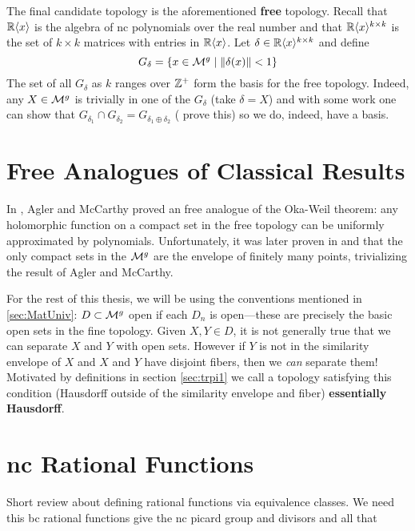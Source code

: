 The final candidate topology is the aforementioned \textbf{free} topology.
Recall that \(\mathbb{R} \langle x \rangle \) is the algebra of nc polynomials over the
real number and that
\(\mathbb{R} \langle x \rangle ^{k\times k}\) is the set of \(k \times k\) matrices
with entries in \(\mathbb{R} \langle x \rangle \). Let
\(\delta \in \mathbb{R} \langle x \rangle ^{k\times k}\) and define
\[
  G_\delta = \{x \in \mathcal{M}^{g} \mid \| \delta(x) \| <1\}
\]
The set of all \(G_\delta\) as \(k\) ranges over \(\mathbb{Z} ^+\) form the basis for
the free topology. Indeed, any \(X \in \mathcal{M}^{g} \) is trivially in one of the
\(G_\delta\) (take \(\delta=X\)) and with some work one can show that
\(G_{\delta_1} \cap G_{\delta_2}= G_{\delta_1\oplus \delta_2}\) ({\color{red}
  prove this}) so we do,
indeed, have a basis.

\section{Free Analogues of Classical Results}%
\label{sec:freeanal}



In \cite{aglerGlobal2013}, Agler and McCarthy proved an free analogue of the
Oka-Weil theorem: any holomorphic function on a compact set in the free topology
can be uniformly approximated by polynomials. Unfortunately, it was later proven
in \cite{pascoeentire2019} and \cite{augatCompact2017} that the only compact
sets in the \(\mathcal{M}^{g} \) are the envelope of finitely many points, trivializing
the result of Agler and McCarthy.

For the rest of this thesis, we will be using the conventions mentioned in
\cref{sec:MatUniv}: \( D \subset\mathcal{M}^{g} \) open if each \(D_n\) is open---these
are precisely the basic open sets in the fine topology.
Given \(X,Y \in D\), it is not generally true that we can separate \(X\) and
\(Y\) with open sets. However if \(Y\) is not in the similarity envelope of
\(X\) and \(X\) and \(Y\) have disjoint fibers, then we \emph{can} separate
them! Motivated by definitions in section \ref{sec:trpi1} we call a topology
satisfying this condition (Hausdorff outside of the similarity envelope and
fiber) \textbf{essentially Hausdorff}.

\section{nc Rational Functions}%
\label{sec:ncrational}

{\color{blue} Short review about defining rational functions via equivalence
  classes. We need this bc rational functions give the nc picard group and
  divisors and all that }

